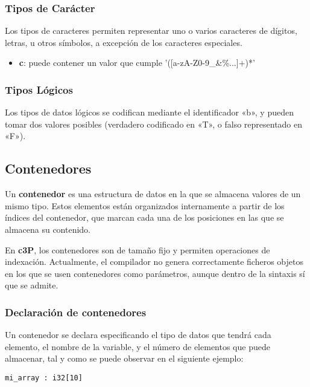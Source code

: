 \subsubsection{Tipos de Carácter}

Los tipos de caracteres permiten representar uno o varios caracteres de dígitos,
letras, u otros símbolos, a excepción de los caracteres especiales.

\begin{itemize}
    \item \textbf{c}: puede contener un valor que cumple '([a-zA-Z0-9\+\-\_\&\%...]+)*'
\end{itemize}

\subsubsection{Tipos Lógicos}

Los tipos de datos lógicos se codifican mediante el identificador «b», y pueden tomar dos
valores posibles (verdadero codificado en «T», o falso representado en «F»).

\subsection{Contenedores}

Un \textbf{contenedor} es una estructura de datos en la que se almacena valores de un
mismo tipo. Estos elementos están organizados internamente a partir de los índices del
contenedor, que marcan cada una de los posiciones en las que se almacena su contenido.

En \textbf{c3P}, los contenedores son de tamaño fijo y permiten operaciones de indexación.
Actualmente, el compilador no genera correctamente ficheros objetos en los que se usen
contenedores como parámetros, aunque dentro de la sintaxis sí que se admite.

\subsubsection{Declaración de contenedores}

Un contenedor se declara especificando el tipo de datos que tendrá cada elemento,
el nombre de la variable, y el número de elementos que puede almacenar, tal y como
se puede observar en el siguiente ejemplo:

\begin{verbatim}
mi_array : i32[10]
\end{verbatim}

